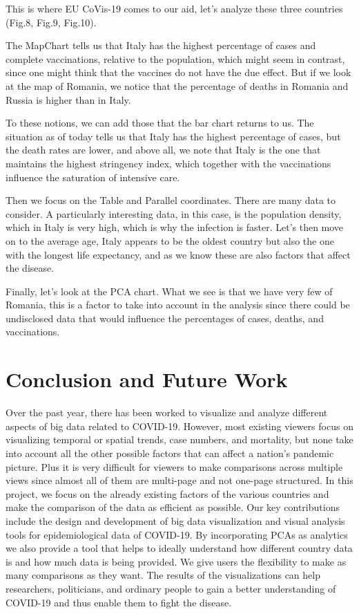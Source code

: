 \documentclass[10pt,conference]{IEEEtran}
\begin{document}
This is where EU CoVis-19 comes to our aid, let's analyze these three countries (Fig.8, Fig.9, Fig.10).

The MapChart tells us that Italy has the highest percentage of cases and complete vaccinations, relative to the population, which might seem in contrast, since one might think that the vaccines do not have the due effect. But if we look at the map of Romania, we notice that the percentage of deaths in Romania and Russia is higher than in Italy.

To these notions, we can add those that the bar chart returns to us. The situation as of today tells us that Italy has the highest percentage of cases, but the death rates are lower, and above all, we note that Italy is the one that maintains the highest stringency index, which together with the vaccinations influence the saturation of intensive care.

Then we focus on the Table and Parallel coordinates. There are many data to consider. A particularly interesting data, in this case, is the population density, which in Italy is very high, which is why the infection is faster. Let's then move on to the average age, Italy appears to be the oldest country but also the one with the longest life expectancy, and as we know these are also factors that affect the disease.

Finally, let's look at the PCA chart. What we see is that we have very few of Romania, this is a factor to take into account in the analysis since there could be undisclosed data that would influence the percentages of cases, deaths, and vaccinations.



\section{Conclusion and Future Work}
Over the past year, there has been worked to visualize and analyze different aspects of big data related to COVID-19. However, most existing viewers focus on visualizing temporal or spatial trends, case numbers, and mortality, but none take into account all the other possible factors that can affect a nation's pandemic picture. Plus it is very difficult for viewers to make comparisons across multiple views since almost all of them are multi-page and not one-page structured. In this project, we focus on the already existing factors of the various countries and make the comparison of the data as efficient as possible. Our key contributions include the design and development of big data visualization and visual analysis tools for epidemiological data of COVID-19. By incorporating PCAs as analytics we also provide a tool that helps to ideally understand how different country data is and how much data is being provided. We give users the flexibility to make as many comparisons as they want. The results of the visualizations can help researchers, politicians, and ordinary people to gain a better understanding of COVID-19 and thus enable them to fight the disease.
\end{document}
